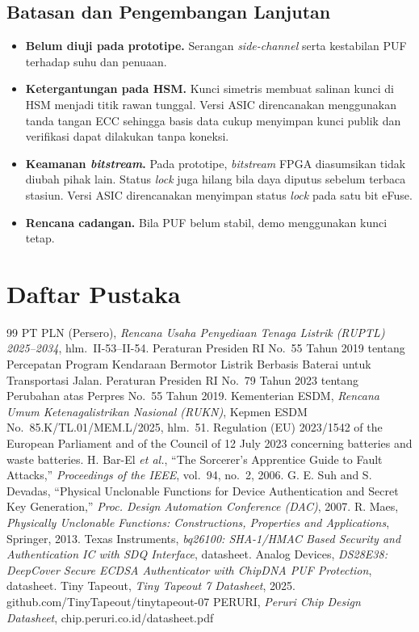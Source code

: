 \documentclass[11pt,a4paper]{article}
\begin{document}
\subsection{Batasan dan Pengembangan Lanjutan}

\begin{itemize}
  \item \textbf{Belum diuji pada prototipe.} Serangan \emph{side-channel} serta kestabilan PUF terhadap suhu dan penuaan.
  \item \textbf{Ketergantungan pada HSM.} Kunci simetris membuat salinan kunci di HSM menjadi titik rawan tunggal. Versi ASIC direncanakan menggunakan tanda tangan ECC sehingga basis data cukup menyimpan kunci publik dan verifikasi dapat dilakukan tanpa koneksi.
  \item \textbf{Keamanan \emph{bitstream}.} Pada prototipe, \emph{bitstream} FPGA diasumsikan tidak diubah pihak lain. Status \emph{lock} juga hilang bila daya diputus sebelum terbaca stasiun. Versi ASIC direncanakan menyimpan status \emph{lock} pada satu bit eFuse.
  \item \textbf{Rencana cadangan.} Bila PUF belum stabil, demo menggunakan kunci tetap.
\end{itemize}

\clearpage
\section*{Daftar Pustaka}
\vspace{-14pt}
\begin{thebibliography}{99}\small
{} PT PLN (Persero), \emph{Rencana Usaha Penyediaan Tenaga Listrik (RUPTL) 2025--2034}, hlm.~II-53--II-54.
 Peraturan Presiden RI No.~55 Tahun 2019 tentang Percepatan Program Kendaraan Bermotor Listrik Berbasis Baterai untuk Transportasi Jalan.
 Peraturan Presiden RI No.~79 Tahun 2023 tentang Perubahan atas Perpres No.~55 Tahun 2019.
 Kementerian ESDM, \emph{Rencana Umum Ketenagalistrikan Nasional (RUKN)}, Kepmen ESDM No.~85.K/TL.01/MEM.L/2025, hlm.~51.
 Regulation (EU) 2023/1542 of the European Parliament and of the Council of 12 July 2023 concerning batteries and waste batteries.
 H. Bar-El \emph{et al.}, ``The Sorcerer's Apprentice Guide to Fault Attacks,'' \emph{Proceedings of the IEEE}, vol.~94, no.~2, 2006.
 G. E. Suh and S. Devadas, ``Physical Unclonable Functions for Device Authentication and Secret Key Generation,'' \emph{Proc. Design Automation Conference (DAC)}, 2007.
 R. Maes, \emph{Physically Unclonable Functions: Constructions, Properties and Applications}, Springer, 2013.
 Texas Instruments, \emph{bq26100: SHA-1/HMAC Based Security and Authentication IC with SDQ Interface}, datasheet.
 Analog Devices, \emph{DS28E38: DeepCover Secure ECDSA Authenticator with ChipDNA PUF Protection}, datasheet.
 Tiny Tapeout, \emph{Tiny Tapeout 7 Datasheet}, 2025. github.com/TinyTapeout/tinytapeout-07
 PERURI, \emph{Peruri Chip Design Datasheet}, chip.peruri.co.id/datasheet.pdf
\end{thebibliography}
\end{document}
